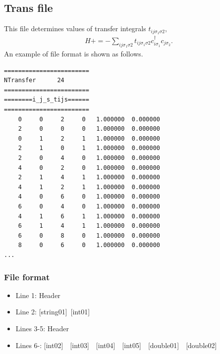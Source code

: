 \newpage
\subsection{Trans file}
\label{Subsec:Trans}
This file determines values of transfer integrals $t_{ij\sigma_1\sigma2}$,
\begin{align}
H +=-\sum_{ij\sigma_1\sigma2} t_{ij\sigma_1\sigma2}c_{i\sigma_1}^{\dag}c_{j\sigma_2}.
\end{align}
An example of file format is shown as follows.\\
\begin{minipage}{12.5cm}
\begin{screen}
\begin{verbatim}
======================== 
NTransfer      24  
======================== 
========i_j_s_tijs====== 
======================== 
    0     0     2     0   1.000000  0.000000
    2     0     0     0   1.000000  0.000000
    0     1     2     1   1.000000  0.000000
    2     1     0     1   1.000000  0.000000
    2     0     4     0   1.000000  0.000000
    4     0     2     0   1.000000  0.000000
    2     1     4     1   1.000000  0.000000
    4     1     2     1   1.000000  0.000000
    4     0     6     0   1.000000  0.000000
    6     0     4     0   1.000000  0.000000
    4     1     6     1   1.000000  0.000000
    6     1     4     1   1.000000  0.000000
    6     0     8     0   1.000000  0.000000
    8     0     6     0   1.000000  0.000000
...
\end{verbatim}
\end{screen}
\end{minipage}

\subsubsection{File format}
\begin{itemize}
   \item  Line 1:  Header
   \item  Line 2:   [string01]~[int01]
   \item  Lines 3-5:  Header
   \item  Lines 6-: [int02]~~[int03]~~[int04]~~[int05]~~[double01]~~[double02] 
  \end{itemize}
